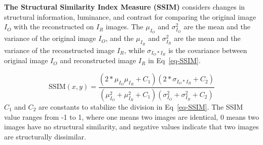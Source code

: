 \documentclass[pdflatex,sn-mathphys-num]{sn-jnl}%
\begin{document}
\noindent \textbf{The Structural Similarity Index Measure (SSIM)} considers changes in structural information, luminance, and contrast for comparing the original image $I_O $ with the reconstructed on $I_R $ images. The $\mu_{I_O} $ and $\sigma_{I_O}^2 $ are the mean and the variance of the original image $I_O$, and the $\mu_{I_R} $ and $\sigma_{I_R}^2 $ are the mean and the variance of the reconstructed image $I_R$, while $\sigma_{I_O*I_R} $ is the covariance between original image ${I_O}$ and reconstructed image ${I_R}$ in Eq~\ref{eq-SSIM}.


\begin{equation}
\text{SSIM}(x, y) = \frac{(2*\mu_{I_O} \mu_{I_R} + C_1)(2*\sigma_{I_O*I_R} + C_2)}{(\mu_{I_O}^2 + \mu_{I_R}^2 + C_1)(\sigma_{I_O}^2 + \sigma_{I_R}^2 + C_2)} \label{eq-SSIM}
\end{equation} $ C_1 $ and $ C_2 $ are constants to stabilize the division in Eq~\ref{eq-SSIM}. The SSIM value ranges from -1 to 1, where one means two images are identical, 0 means two images have no structural similarity, and negative values indicate that two images are structurally dissimilar. 
\end{document}
